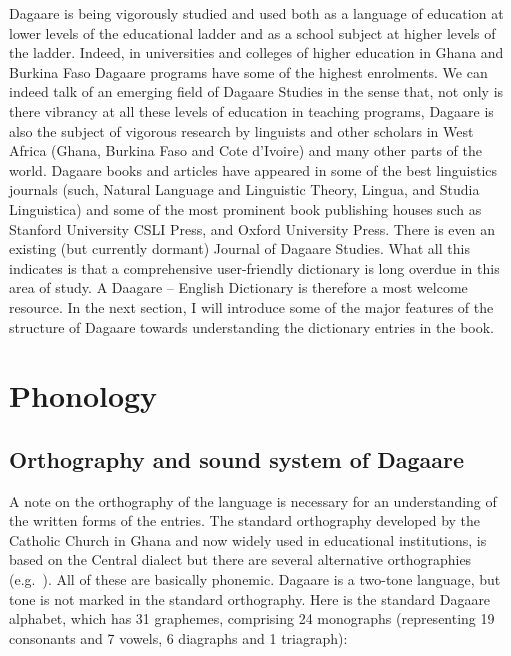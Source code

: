 Dagaare is being vigorously studied and used both as a language of education at lower levels of the educational ladder and as a school subject at higher levels of the ladder. Indeed, in universities and colleges of higher education in Ghana and Burkina Faso Dagaare programs have some of the highest enrolments. We can indeed talk of an emerging field of Dagaare Studies in the sense that, not only is there vibrancy at all these levels of education in teaching programs, Dagaare is also the subject of vigorous research by linguists and other scholars in West Africa (Ghana, Burkina Faso and Cote d'Ivoire) and many other parts of the world. Dagaare books and articles have appeared in some of the best linguistics journals (such, Natural Language and Linguistic Theory, Lingua, and Studia Linguistica) and some of the most prominent book publishing houses such as Stanford University CSLI Press, and Oxford University Press. There is even an existing (but currently dormant) Journal of Dagaare Studies. What all this indicates is that a comprehensive user-friendly dictionary is long overdue in this area of study. A Daagare – English Dictionary is therefore a most welcome resource. In the next section, I will introduce some of the major features of the structure of Dagaare towards understanding the dictionary entries in the book.


\section{Phonology}

\subsection{Orthography and sound system of Dagaare}

A note on the orthography of the language is necessary for an understanding of the written forms of the entries. The standard orthography developed by the Catholic Church in Ghana and now widely used in educational institutions, is based on the Central dialect but there are several alternative orthographies (e.g.\  \citealt{Nakuma1999,Nakuma2002}). All of these are basically phonemic. Dagaare is a two-tone language, but tone is not marked in the standard orthography. Here is the standard Dagaare alphabet, which has 31 graphemes, comprising 24 monographs (representing 19 consonants and 7 vowels, 6 diagraphs and 1 triagraph):

